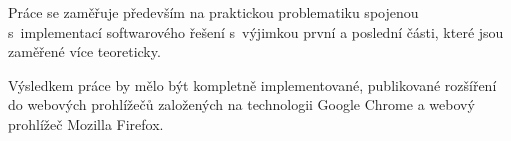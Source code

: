 Práce se zaměřuje především na praktickou problematiku spojenou s~implementací softwarového řešení s~výjimkou první a poslední části, které jsou zaměřené více teoreticky.

Výsledkem práce by mělo být kompletně implementované, publikované rozšíření do webových prohlížečů založených na technologii Google Chrome a webový prohlížeč Mozilla Firefox.





